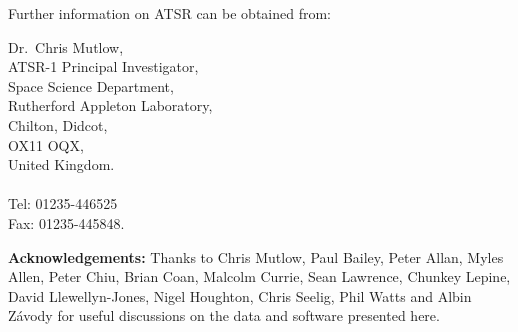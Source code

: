 Further information on ATSR can be obtained from:

Dr.\ Chris Mutlow,\\
ATSR-1 Principal Investigator,\\
Space Science Department,\\
Rutherford Appleton Laboratory,\\
Chilton, Didcot,\\
OX11 OQX,\\
United Kingdom.\\
~\\
Tel: 01235-446525\\
Fax: 01235-445848.

\bigskip

{\large\bf Acknowledgements:}
Thanks to Chris Mutlow, Paul Bailey, Peter Allan, Myles Allen, Peter Chiu, 
Brian Coan, Malcolm Currie, Sean Lawrence, Chunkey Lepine, 
David Llewellyn-Jones, Nigel Houghton, Chris Seelig, Phil Watts 
and Albin Z\'{a}vody for useful discussions on the data and software
presented here.


